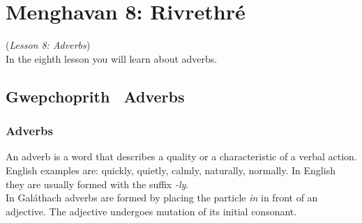 \section{Menghavan 8: Rivrethr\'{e}}
(\textit{Lesson 8: Adverbs})\\

In the eighth lesson you will learn about adverbs.

\subsection{Gwepchoprith \textendash\ Adverbs}
\subsubsection{Adverbs}

An adverb is a word that describes a quality or a characteristic of a verbal action.\\
English examples are: quickly, quietly, calmly, naturally, normally. In English they are usually formed with the suffix \textit{-ly}.\\
In Gal\'{a}thach adverbs are formed by placing the particle \textit{in} in front of an adjective. The adjective undergoes mutation of its initial consonant.
